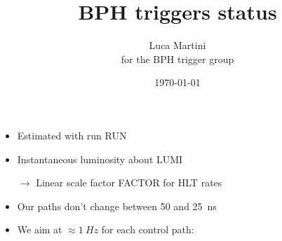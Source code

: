 

\usepackage{pgf-pie}

\title{BPH triggers status}

\author[Luca]{Luca Martini \\ for the BPH trigger group}
\date{\today}


\graphicspath{{../2015_03_12_TSG_Padova/}}





\begin{frame}

\begin{itemize}
\item Estimated with run RUN
\item Instantaneous luminosity about LUMI
\item[$\to$] Linear scale factor FACTOR for HLT rates
\end{itemize}

\end{frame}

\begin{frame}
  \centering
  \ssmall
  

\end{frame}

\begin{frame}
  \vspace{-0.5cm}

  \begin{itemize}
  \item Our paths don't change between \num{50} and \SI{25}{ns}
  \end{itemize}

  \ssmall
  \centering
  

\end{frame}

\begin{frame}
  \vspace{-0.5cm}

  \ssmall
  \centering
  

  \small
  \begin{itemize}
  \item We aim at $\approx\SI{1}{Hz}$ for each control path:
  \end{itemize}


\end{frame}

